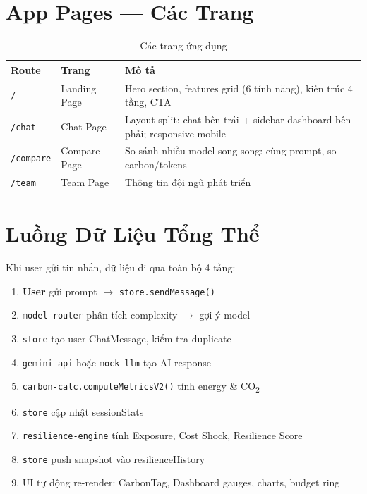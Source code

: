 \documentclass[12pt,a4paper]{article}
\begin{document}
\section{App Pages — Các Trang}

\begin{table}[h]
    \centering
    \begin{tabular}{llp{8cm}}
        \toprule
        \textbf{Route} & \textbf{Trang} & \textbf{Mô tả} \\
        \midrule
        \texttt{/} & Landing Page & Hero section, features grid (6 tính năng), kiến trúc 4 tầng, CTA \\
        \texttt{/chat} & Chat Page & Layout split: chat bên trái + sidebar dashboard bên phải; responsive mobile \\
        \texttt{/compare} & Compare Page & So sánh nhiều model song song: cùng prompt, so carbon/tokens \\
        \texttt{/team} & Team Page & Thông tin đội ngũ phát triển \\
        \bottomrule
    \end{tabular}
    \caption{Các trang ứng dụng}
\end{table}

\section{Luồng Dữ Liệu Tổng Thể}

Khi user gửi tin nhắn, dữ liệu đi qua toàn bộ 4 tầng:

\begin{enumerate}
    \item \textbf{User} gửi prompt $\rightarrow$ \texttt{store.sendMessage()}
    \item \texttt{model-router} phân tích complexity $\rightarrow$ gợi ý model
    \item \texttt{store} tạo user ChatMessage, kiểm tra duplicate
    \item \texttt{gemini-api} hoặc \texttt{mock-llm} tạo AI response
    \item \texttt{carbon-calc.computeMetricsV2()} tính energy \& CO\textsubscript{2}
    \item \texttt{store} cập nhật sessionStats
    \item \texttt{resilience-engine} tính Exposure, Cost Shock, Resilience Score
    \item \texttt{store} push snapshot vào resilienceHistory
    \item UI tự động re-render: CarbonTag, Dashboard gauges, charts, budget ring
\end{enumerate}
\end{document}
